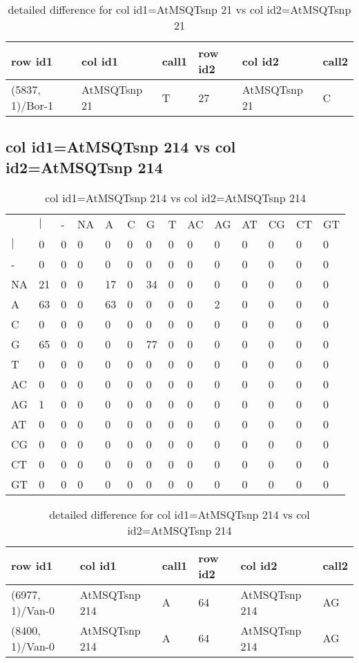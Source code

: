 \begin{center}
\begin{longtable}{|l|l|l|l|l|l|}
\caption{detailed difference for col id1=AtMSQTsnp 21 vs col id2=AtMSQTsnp 21} \label{table_dm779}\\
\hline
row id1&col id1&call1&row id2&col id2&call2\\
\hline
(5837, 1)/Bor-1&AtMSQTsnp 21&T&27&AtMSQTsnp 21&C\\
\hline
\end{longtable}
\end{center}

\subsection{col id1=AtMSQTsnp 214 vs col id2=AtMSQTsnp 214}
\begin{center}
\begin{longtable}{|l|l|l|l|l|l|l|l|l|l|l|l|l|l|}
\caption{col id1=AtMSQTsnp 214 vs col id2=AtMSQTsnp 214} \label{table_dm780}\\
\hline
\\
\hline
&$|$&-&NA&A&C&G&T&AC&AG&AT&CG&CT&GT\\
$|$&0&0&0&0&0&0&0&0&0&0&0&0&0\\
-&0&0&0&0&0&0&0&0&0&0&0&0&0\\
NA&21&0&0&17&0&34&0&0&0&0&0&0&0\\
A&63&0&0&63&0&0&0&0&2&0&0&0&0\\
C&0&0&0&0&0&0&0&0&0&0&0&0&0\\
G&65&0&0&0&0&77&0&0&0&0&0&0&0\\
T&0&0&0&0&0&0&0&0&0&0&0&0&0\\
AC&0&0&0&0&0&0&0&0&0&0&0&0&0\\
AG&1&0&0&0&0&0&0&0&0&0&0&0&0\\
AT&0&0&0&0&0&0&0&0&0&0&0&0&0\\
CG&0&0&0&0&0&0&0&0&0&0&0&0&0\\
CT&0&0&0&0&0&0&0&0&0&0&0&0&0\\
GT&0&0&0&0&0&0&0&0&0&0&0&0&0\\
\hline
\end{longtable}
\end{center}

\begin{center}
\begin{longtable}{|l|l|l|l|l|l|}
\caption{detailed difference for col id1=AtMSQTsnp 214 vs col id2=AtMSQTsnp 214} \label{table_dm781}\\
\hline
row id1&col id1&call1&row id2&col id2&call2\\
\hline
(6977, 1)/Van-0&AtMSQTsnp 214&A&64&AtMSQTsnp 214&AG\\
(8400, 1)/Van-0&AtMSQTsnp 214&A&64&AtMSQTsnp 214&AG\\
\hline
\end{longtable}
\end{center}

